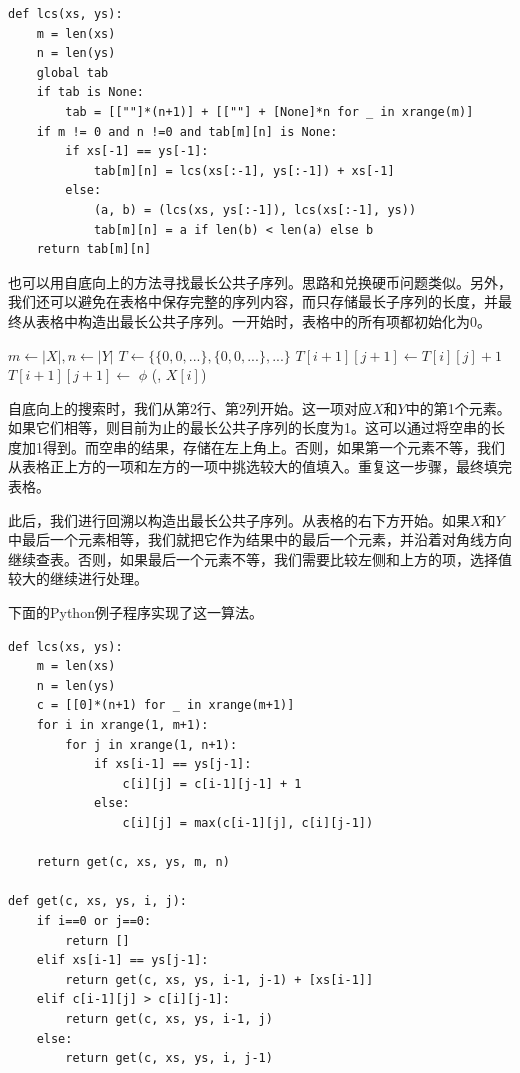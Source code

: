 \documentclass[b5paper]{ctexart}
\begin{document}
\lstset{language=Python}
\begin{lstlisting}
def lcs(xs, ys):
    m = len(xs)
    n = len(ys)
    global tab
    if tab is None:
        tab = [[""]*(n+1)] + [[""] + [None]*n for _ in xrange(m)]
    if m != 0 and n !=0 and tab[m][n] is None:
        if xs[-1] == ys[-1]:
            tab[m][n] = lcs(xs[:-1], ys[:-1]) + xs[-1]
        else:
            (a, b) = (lcs(xs, ys[:-1]), lcs(xs[:-1], ys))
            tab[m][n] = a if len(b) < len(a) else b
    return tab[m][n]
\end{lstlisting}

也可以用自底向上的方法寻找最长公共子序列。思路和兑换硬币问题类似。另外，我们还可以避免在表格中保存完整的序列内容，而只存储最长子序列的长度，并最终从表格中构造出最长公共子序列。一开始时，表格中的所有项都初始化为0。

\begin{algorithmic}[1]
  \State $m \gets |X|, n \gets |Y|$
  \State $T \gets \{\{0, 0, ...\}, \{0, 0, ...\}, ...\}$ 
        \State $T[i+1][j+1] \gets T[i][j] + 1$
      \Else
        \State $T[i+1][j+1] \gets$ 
      \EndIf
    \EndFor
  \EndFor
  \State \Return {}
\EndFunction
\Statex
{}
    \State \Return $\phi$
    \State \Return {}(, $X[i]$)
    \State \Return {}
  \Else
    \State \Return {}
  \EndIf
\EndFunction
\end{algorithmic}

自底向上的搜索时，我们从第2行、第2列开始。这一项对应$X$和$Y$中的第1个元素。如果它们相等，则目前为止的最长公共子序列的长度为1。这可以通过将空串的长度加1得到。而空串的结果，存储在左上角上。否则，如果第一个元素不等，我们从表格正上方的一项和左方的一项中挑选较大的值填入。重复这一步骤，最终填完表格。

此后，我们进行回溯以构造出最长公共子序列。从表格的右下方开始。如果$X$和$Y$中最后一个元素相等，我们就把它作为结果中的最后一个元素，并沿着对角线方向继续查表。否则，如果最后一个元素不等，我们需要比较左侧和上方的项，选择值较大的继续进行处理。

下面的Python例子程序实现了这一算法。

\lstset{language=Python}
\begin{lstlisting}
def lcs(xs, ys):
    m = len(xs)
    n = len(ys)
    c = [[0]*(n+1) for _ in xrange(m+1)]
    for i in xrange(1, m+1):
        for j in xrange(1, n+1):
            if xs[i-1] == ys[j-1]:
                c[i][j] = c[i-1][j-1] + 1
            else:
                c[i][j] = max(c[i-1][j], c[i][j-1])

    return get(c, xs, ys, m, n)

def get(c, xs, ys, i, j):
    if i==0 or j==0:
        return []
    elif xs[i-1] == ys[j-1]:
        return get(c, xs, ys, i-1, j-1) + [xs[i-1]]
    elif c[i-1][j] > c[i][j-1]:
        return get(c, xs, ys, i-1, j)
    else:
        return get(c, xs, ys, i, j-1)
\end{lstlisting}
\end{document}
